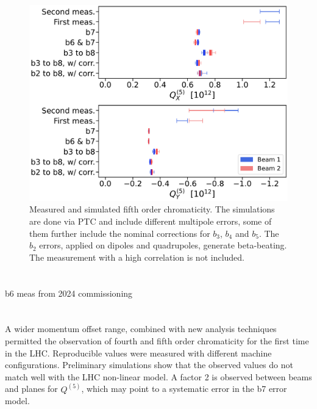 \begin{figure}[tbh]
    \centering
    \includegraphics[width=1\columnwidth]{images/MOPL027_f4-1.pdf}
    \caption{Measured and simulated fifth order chromaticity. 
             The simulations are done via PTC and include different multipole errors, some of them further
             include the nominal corrections for $b_3$, $b_4$ and $b_5$.
             The $b_2$ errors, applied on dipoles and quadrupoles, generate beta-beating.
             The measurement with a high correlation is not included.}
    \label{beam1_q5x_ptc}
\end{figure}




\section{}

b6 meas from 2024 commissioning




\section{}

A wider momentum offset range, combined with new analysis techniques permitted the observation of fourth and fifth order chromaticity for the first time in the LHC. Reproducible values were measured with different machine configurations.
Preliminary simulations show that the observed values do not match well with the LHC non-linear model. A factor 2 is observed between beams and planes for $Q^{(5)}$, which may point to a systematic error in the b7 error model.

